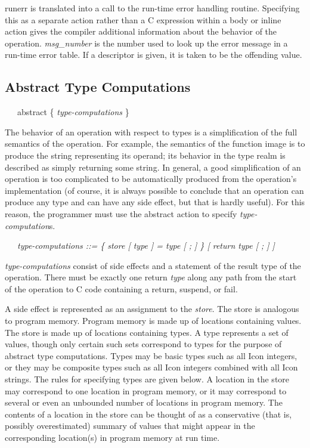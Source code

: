 runerr is translated into a call to the run-time error handling
routine. Specifying this as a separate action rather than a C
expression within a body or inline action gives the compiler
additional information about the behavior of the
operation. \textit{msg\_number} is the number used to look up the
error message in a run-time error table. If a descriptor is given, it
is taken to be the offending value.

\subsection{Abstract Type Computations}
{\ttfamily\mdseries
\ \ \ abstract \{ \textit{type-computations} \}}


The behavior of an operation with respect to types is a simplification
of the full semantics of the operation. For example, the semantics of
the function image is to produce the string representing its operand;
its behavior in the type realm is described as simply returning some
string. In general, a good simplification of an operation is too
complicated to be automatically produced from the operation's
implementation (of course, it is always possible to conclude that an
operation can produce any type and can have any side effect, but that
is hardly useful). For this reason, the programmer must use the
abstract action to specify \textit{type-computation}s.

{\ttfamily\mdseries
\ \ \ \textit{type-computations ::= \{ store [ type ] = type [ ; ] \} [ return type [ ; ] ]}}


\textit{type-computations} consist of side effects and a statement of
the result type of the operation. There must be exactly one return
\textit{type} along any path from the start of the operation to C code
containing a return, suspend, or fail.

A side effect is represented as an assignment to the
\textit{store}. The store is analogous to program memory. Program
memory is made up of locations containing values. The store is made up
of locations containing types. A type represents a set of values,
though only certain such sets correspond to types for the purpose of
abstract type computations. Types may be basic types such as all Icon
integers, or they may be composite types such as all Icon integers
combined with all Icon strings. The rules for specifying types are
given below. A location in the store may correspond to one location in
program memory, or it may correspond to several or even an unbounded
number of locations in program memory.  The contents of a location in
the store can be thought of as a conservative (that is, possibly
overestimated) summary of values that might appear in the
corresponding location(s) in program memory at run time.


